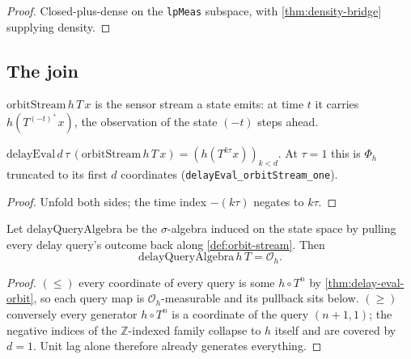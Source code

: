 \begin{proof}
  \leanok
  Closed-plus-dense on the \texttt{lpMeas} subspace, with
  \ref{thm:density-bridge} supplying density.
\end{proof}

\subsection{The join}

\begin{definition}
  \label{def:orbit-stream}
  \leanok
  $\mathrm{orbitStream}\,h\,T\,x$ is the sensor stream a state emits:
  at time $t$ it carries $h(T^{(-t)^{+}} x)$, the observation of the state
  $(-t)$ steps ahead.
\end{definition}

\begin{theorem}
  \label{thm:delay-eval-orbit}
  \leanok
  $\mathrm{delayEval}\,d\,\tau\,(\mathrm{orbitStream}\,h\,T\,x)
   = (h(T^{k\tau} x))_{k < d}$. At $\tau = 1$ this is $\Phi_h$ truncated to its
  first $d$ coordinates (\texttt{delayEval\_orbitStream\_one}).
\end{theorem}

\begin{proof}
  \leanok
  Unfold both sides; the time index $-(k\tau)$ negates to $k\tau$.
\end{proof}

\begin{theorem}
  \label{thm:query-reconstruction-bridge}
  \leanok
  Let $\mathrm{delayQueryAlgebra}$ be the $\sigma$-algebra induced on the state
  space by pulling every delay query's outcome back along
  \ref{def:orbit-stream}. Then
  \[ \mathrm{delayQueryAlgebra}\,h\,T = \mathcal{O}_h. \]
\end{theorem}

\begin{proof}
  \leanok
  $(\le)$ every coordinate of every query is some $h \circ T^{n}$ by
  \ref{thm:delay-eval-orbit}, so each query map is $\mathcal{O}_h$-measurable
  and its pullback sits below. $(\ge)$ conversely every generator
  $h \circ T^{n}$ is a coordinate of the query $(n+1, 1)$; the negative indices
  of the $\mathbb{Z}$-indexed family collapse to $h$ itself and are covered by
  $d = 1$. Unit lag alone therefore already generates everything.
\end{proof}

